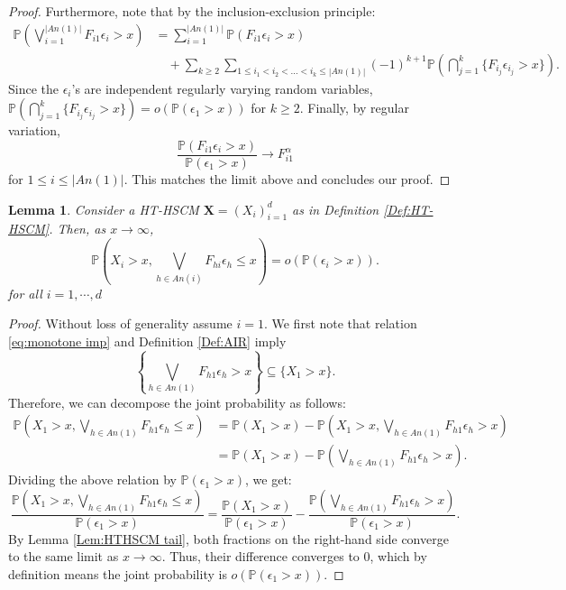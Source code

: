 \documentclass[10pt]{article}
\newtheorem{lemma}[theorem]{Lemma}
\begin{document}
\begin{proof}
    Furthermore,   note that by the inclusion-exclusion principle:
    \begin{align*}
        \mathbb{P}\left(\bigvee_{i=1}^{|An(1)|} F_{i1} \epsilon_i > x\right) &= \sum_{i=1}^{|An(1)|} \mathbb{P}(F_{i1} \epsilon_i > x) \\
        &\quad + \sum_{k \ge 2} \sum_{1 \le i_1 < i_2 < \dots < i_k \le |An(1)|} (-1)^{k+1} \mathbb{P}\left( \bigcap_{j=1}^k \{F_{i_j} \epsilon_{i_j} > x\} \right).
    \end{align*}
    Since the $\epsilon_{i}$'s are independent regularly varying random variables, $\mathbb{P}\left(\bigcap_{j=1}^k \{F_{i_j} \epsilon_{i_j} > x\}\right) = o(\mathbb{P}(\epsilon_1 > x))$ for $k \ge 2$. Finally, by regular variation,
    \[
        \frac{\mathbb{P}(F_{i1}\epsilon_i > x)}{\mathbb{P}(\epsilon_1 > x)} \to F_{i1}^\alpha
    \]
    for $1 \le i \le |An(1)|$. This matches the limit above and concludes our proof.
\end{proof}

 
    
    \begin{lemma}\label{Lem:exc and non-exc neg}
    Consider a HT-HSCM $\boldsymbol{X}=(X_i)_{i=1}^d$ as in Definition \ref{Def:HT-HSCM}.
Then, as $x \to \infty$,
\[
    \mathbb{P}\left(X_i > x, \bigvee_{h \in An(i)} F_{hi} \epsilon_h \le x\right) = o(\mathbb{P}(\epsilon_i > x)).
\] for all $i =1, \cdots ,d $
\end{lemma}
\begin{proof}
   Without loss  of generality assume $i=1$. We first note that relation \eqref{eq:monotone imp} and Definition \ref{Def:AIR} imply
    \begin{equation}\label{eq:single exc imp exc}
        \left\{ \bigvee_{h \in An(1)} F_{h1} \epsilon_h > x \right\} \subseteq \{X_1 > x\}.
    \end{equation}
    Therefore, we can decompose the joint probability as follows:
    \begin{align*}
        \mathbb{P}\left( X_1 > x, \bigvee_{h \in An(1)}F_{h1} \epsilon_h \le x \right) &= \mathbb{P}(X_1 > x) - \mathbb{P}\left( X_1 > x, \bigvee_{h \in An(1)}F_{h1} \epsilon_h > x \right) \\
        &= \mathbb{P}(X_1 > x) - \mathbb{P}\left( \bigvee_{h \in An(1)}F_{h1} \epsilon_h > x \right).
    \end{align*}
    Dividing the above relation by $\mathbb{P}(\epsilon_1 > x)$, we get:
    \[
        \frac{\mathbb{P}\left( X_1 > x, \bigvee_{h \in An(1)}F_{h1} \epsilon_h \le x \right)}{\mathbb{P}(\epsilon_1 > x)} = \frac{\mathbb{P}(X_1 > x)}{\mathbb{P}(\epsilon_1 > x)} - \frac{\mathbb{P}\left( \bigvee_{h \in An(1)}F_{h1} \epsilon_h > x \right)}{\mathbb{P}(\epsilon_1 > x)}.
    \]
    By Lemma \ref{Lem:HTHSCM tail}, both fractions on the right-hand side converge to the same limit as $x \to \infty$. Thus, their difference converges to $0$, which by definition means the joint probability is $o(\mathbb{P}(\epsilon_1 > x))$.
\end{proof}
\end{document}
